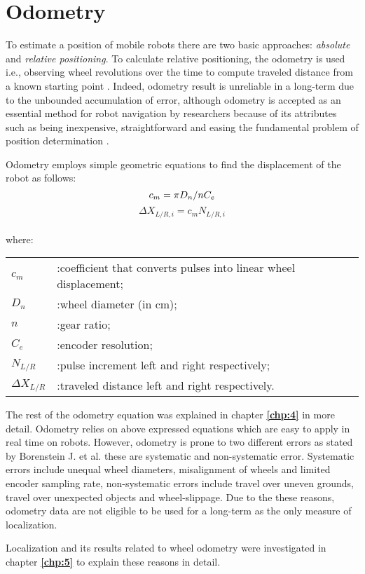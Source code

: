 \section{Odometry}\label{sec:odom}
To estimate a position of mobile robots there are two basic approaches: \textit{absolute} and \textit{relative positioning}. To calculate relative positioning, the odometry is used i.e., observing wheel revolutions over the time to compute traveled distance from a known starting point \cite{odometry1}. Indeed, odometry result is unreliable in a long-term due to the unbounded accumulation of error, although odometry is accepted as an essential method for robot navigation by researchers because of its attributes such as being inexpensive, straightforward and easing the fundamental problem of position determination \cite{odometry2}. 
\par Odometry employs simple geometric equations to find the displacement of the robot as follows:
\begin{equation}
    c_m = \pi D_n/nC_e \\
\end{equation}
\begin{equation}
    \Delta X_{L/R,i} = c_mN_{L/R,i} 
\end{equation}
\\
where: \\
\begin{tabular}{l l}
    $c_m$ &:coefficient that converts pulses into linear wheel displacement; \\
    $D_n$ &:wheel diameter (in cm); \\
    $n$ &:gear ratio;\\
    $C_e$ &:encoder resolution;\\
    $N_{L/R}$ &:pulse increment left and right respectively;\\
    $\Delta X_{L/R}$ &:traveled distance left and right respectively.
\end{tabular}
\newpage
\noindent The rest of the odometry equation was explained in chapter \textbf{\ref{chp:4}} in more detail. Odometry relies on above expressed equations which are easy to apply in real time on robots. However, odometry is prone to two different errors as stated by Borenstein J. et al. \cite{odometry1} these are systematic and non-systematic error. Systematic errors include unequal wheel diameters, misalignment of wheels and limited encoder sampling rate, non-systematic errors include travel over uneven grounds, travel over unexpected objects and wheel-slippage. Due to the these reasons, odometry data are not eligible to be used for a long-term as the only measure of localization.
\par Localization and its results related to wheel odometry were investigated in chapter \textbf{\ref{chp:5}} to explain these reasons in detail.
